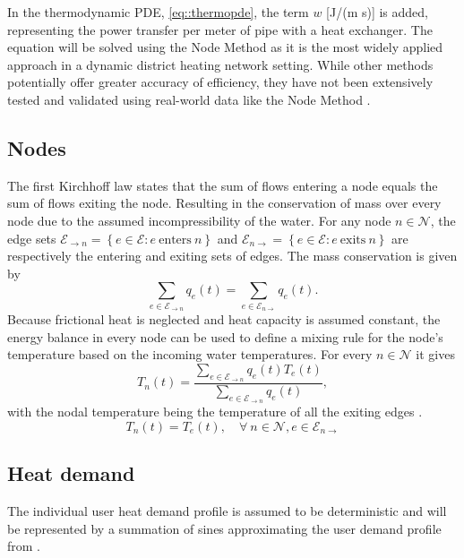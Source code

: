 In the thermodynamic PDE, \ref{eq::thermopde}, the term $w$ [J/(m s)] is added, representing the power transfer per meter of pipe with a heat exchanger. The equation will be solved using the Node Method as it is the most widely applied approach in a dynamic district heating network setting. While other methods potentially offer greater accuracy of efficiency, they have not been extensively tested and validated using real-world data like the Node Method \cite{KUNTUAROVA}.

\subsection{Nodes}
The first Kirchhoff law states that the sum of flows entering a node equals the sum of flows exiting the node. Resulting in the conservation of mass over every node due to the assumed incompressibility of the water. For any node $n \in \mathcal{N}$, the edge sets $\mathcal{E}_{\rightarrow n} = \left\{ e \in \mathcal{E} : e \  \text{enters} \ n\right\}$ and $\mathcal{E}_{n\rightarrow } = \left\{ e \in \mathcal{E} : e \  \text{exits} \ n\right\}$ are respectively the entering and exiting sets of edges. The mass conservation is given by
\begin{equation}
    \sum_{e  \in \mathcal{E}_{\rightarrow n}} q_e(t) = \sum_{e  \in \mathcal{E}_{n \rightarrow}} q_e(t).
\end{equation}
Because frictional heat is neglected and heat capacity is assumed constant, the energy balance in every node can be used to define a mixing rule for the node's temperature based on the incoming water temperatures. For every $n \in \mathcal{N}$ it gives
\begin{equation}
    T_n(t) = \frac{\sum_{e  \in \mathcal{E}_{\rightarrow n}} q_e(t) T_e(t)}{\sum_{e  \in \mathcal{E}_{\rightarrow n}} q_e(t)},
\end{equation}
with the nodal temperature being the temperature of all the exiting edges \cite{Krug2020}. 
\begin{equation}
    T_n(t) = T_e(t), \quad \forall \ n \in \mathcal{N}, e \in \mathcal{E}_{n \rightarrow} 
\end{equation}

\subsection{Heat demand}
The individual user heat demand profile is assumed to be deterministic and will be represented by a summation of sines approximating the user demand profile from \cite{Krug2020}. 

